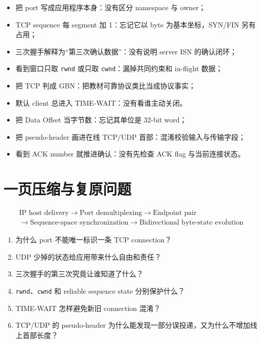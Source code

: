 \documentclass[UTF8,fontset=none,11pt,a4paper]{ctexart}
\providecommand{\tightlist}{\setlength{\itemsep}{0pt}\setlength{\parskip}{0pt}}
\providecommand{\passthrough}[1]{#1}
\begin{document}
\begin{itemize}
\tightlist
\item
  把 port 写成应用程序本身：没有区分 namespace 与 owner；
\item
  TCP sequence 每 segment 加 1：忘记它以 byte 为基本坐标，SYN/FIN
  另有占用；
\item
  三次握手解释为``第三次确认数据''：没有说明 server ISN 的确认闭环；
\item
  看到窗口只取 \passthrough{\lstinline!rwnd!} 或只取
  \passthrough{\lstinline!cwnd!}：漏掉共同约束和 in-flight 数据；
\item
  把 TCP 判成 GBN：把教材可靠协议类比当成协议事实；
\item
  默认 client 总进入 TIME-WAIT：没有看谁主动关闭。
\item
  把 Data Offset 当字节数：忘记其单位是 32-bit word；
\item
  把 pseudo-header 画进在线 TCP/UDP 首部：混淆校验输入与传输字段；
\item
  看到 ACK number 就推进确认：没有先检查 ACK flag 与当前连接状态。
\end{itemize}

\section{一页压缩与复原问题}\label{15-ux4e00ux9875ux538bux7f29ux4e0eux590dux539fux95eeux9898}

\[
\boxed{\begin{gathered}
\text{IP host delivery}\to\text{Port demultiplexing}\to\text{Endpoint pair}\\
\to\text{Sequence-space synchronization}\to\text{Bidirectional byte-state evolution}
\end{gathered}}
\]

\begin{enumerate}
\def\labelenumi{\arabic{enumi}.}
\tightlist
\item
  为什么 port 不能唯一标识一条 TCP connection？
\item
  UDP 少掉的状态给应用带来什么自由和责任？
\item
  三次握手的第三次究竟让谁知道了什么？
\item
  \passthrough{\lstinline!rwnd!}、\passthrough{\lstinline!cwnd!} 和
  reliable sequence state 分别保护什么？
\item
  TIME-WAIT 怎样避免新旧 connection 混淆？
\item
  TCP/UDP 的 pseudo-header 为什么能发现一部分误投递，又为什么不增加线上首部长度？
\end{enumerate}
\end{document}
